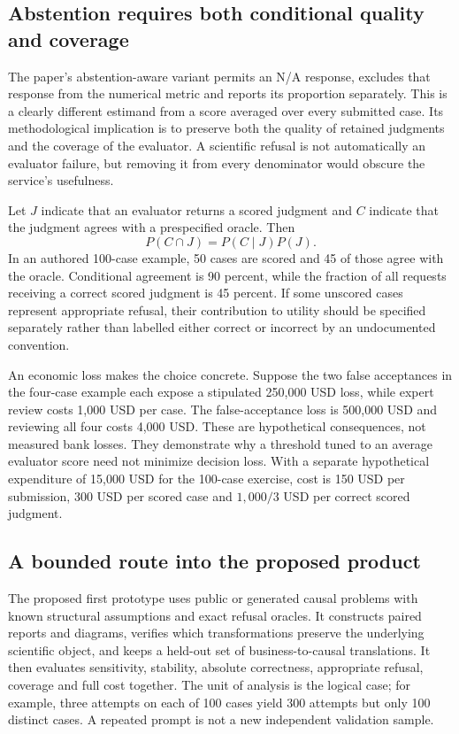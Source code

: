 \subsection{Abstention requires both conditional quality and coverage}

The paper's abstention-aware variant permits an N/A response, excludes that
response from the numerical metric and reports its proportion separately.
This is a clearly different estimand from a score averaged over every
submitted case. Its methodological implication is to preserve both the
quality of retained judgments and the coverage of the evaluator.
A scientific refusal is not automatically an evaluator failure, but
removing it from every denominator would obscure the service's usefulness.
\citep{exec24_judgebias_original}

Let $J$ indicate that an evaluator returns a scored judgment and $C$ indicate
that the judgment agrees with a prespecified oracle. Then
\[
 P(C\cap J)=P(C\mid J)P(J).
\]
In an authored 100-case example, 50 cases are scored and 45 of those agree
with the oracle. Conditional agreement is 90 percent, while the fraction
of all requests receiving a correct scored judgment is 45 percent. If
some unscored cases represent appropriate refusal, their contribution to
utility should be specified separately rather than labelled either correct
or incorrect by an undocumented convention.
\citep{exec24_judgebias_reference}

An economic loss makes the choice concrete. Suppose the two false
acceptances in the four-case example each expose a stipulated 250,000 USD
loss, while expert review costs 1,000 USD per case. The false-acceptance
loss is 500,000 USD and reviewing all four costs 4,000 USD. These are
hypothetical consequences, not measured bank losses. They demonstrate why
a threshold tuned to an average evaluator score need not minimize decision
loss. With a separate hypothetical expenditure of 15,000 USD for the
100-case exercise, cost is 150 USD per submission, 300 USD per scored case
and $1{,}000/3$ USD per correct scored judgment.
\citep{exec24_judgebias_reference}

\subsection{A bounded route into the proposed product}

The proposed first prototype uses public or generated causal problems with
known structural assumptions and exact refusal oracles. It constructs
paired reports and diagrams, verifies which transformations preserve the
underlying scientific object, and keeps a held-out set of business-to-causal
translations. It then evaluates sensitivity, stability, absolute correctness,
appropriate refusal, coverage and full cost together. The unit of analysis
is the logical case; for example, three attempts on each of 100 cases yield
300 attempts but only 100 distinct cases. A repeated prompt is not a new
independent validation sample.\citep{exec24_judgebias_reference}

